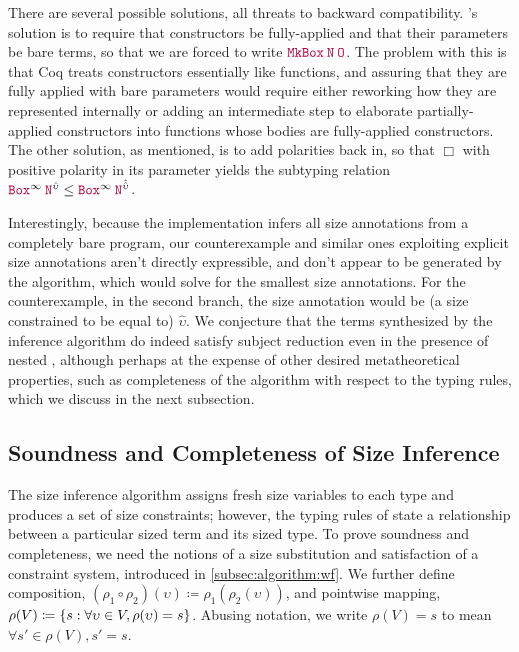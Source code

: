 There are several possible solutions, all threats to backward compatibility.
\CIChat's solution is to require that constructors be fully-applied and that their parameters be bare terms,
so that we are forced to write $\app{\MkBox}{\nat}{\Zero}$.
The problem with this is that Coq treats constructors essentially like functions,
and assuring that they are fully applied with bare parameters would require either reworking how they are represented internally
or adding an intermediate step to elaborate partially-applied constructors into functions whose bodies are fully-applied constructors.
The other solution, as mentioned, is to add polarities back in, so that $\Box$ with positive polarity in its parameter yields the subtyping relation $\app{\Box^\infty}{\nat^{\hat{\upsilon}}} \leq \app{\Box^\infty}{\nat^{\hat{\hat{\upsilon}}}}$.

Interestingly, because the implementation infers all size annotations from a completely bare program,
our counterexample and similar ones exploiting explicit size annotations aren't directly expressible,
and don't appear to be generated by the algorithm, which would solve for the smallest size annotations.
For the counterexample, in the second branch, the size annotation would be (a size constrained to be equal to) $\hat{\upsilon}$.
We conjecture that the terms synthesized by the inference algorithm do indeed satisfy subject reduction even in the presence of nested \coinductives,
although perhaps at the expense of other desired metatheoretical properties,
such as completeness of the algorithm with respect to the typing rules,
which we discuss in the next subsection.

\iffalse %
\subsection{Soundness and Completeness of Size Inference}\label{sec:meta:sound-complete}
The size inference algorithm assigns fresh size variables to each \coinductive type and produces a set of size constraints; however, the typing rules of \lang state a relationship between a particular sized term and its sized type.
To prove soundness and completeness, we need the notions of a size substitution and satisfaction of a constraint system, introduced in \autoref{subsec:algorithm:wf}.
We further define composition, $(\rho_1 \circ \rho_2)(\upsilon) \coloneqq \rho_1(\rho_2(\upsilon))$, and pointwise mapping, $\rho(V) \coloneqq \{s : \forall \upsilon \in V, \rho(\upsilon) = s\}$.
Abusing notation, we write $\rho(V) = s$ to mean $\forall s' \in \rho(V), s' = s$.

